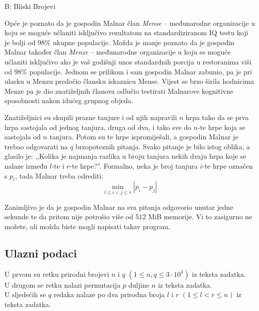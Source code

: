 \begin{statement}[
  timelimit=1 s,
  memorylimit=512 MiB,
]{B: Bliski Brojevi}

Opće je poznato da je gospodin Malnar član \textit{Mense} -- međunarodne
organizacije u koju se moguće učlaniti isključivo rezultatom na standardiziranom
IQ testu koji je bolji od $98\%$ ukupne populacije. Možda je manje poznato da je
gospodin Malnar također član \textit{Menze} -- međunarodne organizacije u koju
se moguće učlaniti isključivo ako je vaš godišnji unos standardnih porcija u
restoranima viši od $98\%$ populacije. Jednom se prilikom i sam gospodin Malnar
zabunio, pa je pri ulasku u Menzu predočio člansku iskaznicu Mense. Vijest se
brzo širila hodnicima Menze pa je dio znatiželjnih članova odlučio testirati
Malnarove kognitivne sposobnosti nakon idućeg grupnog objeda.

Znatiželjnici su skupili prazne tanjure i od njih napravili $n$ hrpa tako
da se prva hrpa sastojala od jednog tanjura, druga od dva, i tako sve do
$n$-te hrpe koja se sastojala od $n$ tanjura. Potom su te hrpe ispromiješali, a
gospodin Malnar je trebao odgovarati na $q$ brzopoteznih pitanja. Svako pitanje
je bilo istog oblika, a glasilo je: ,,Kolika je najmanja razlika u broju tanjura
nekih dvaju hrpa koje se nalaze između $l$-te i $r$-te hrpe?''. Formalno, neka
je broj tanjura $i$-te hrpe označen s $p_i$, tada Malnar treba odrediti:
$$\min_{l \le i < j \le r}{|p_i - p_j|}$$

Zanimljivo je da je gospodin Malnar na sva pitanja odgovorio unutar jedne
sekunde te da pritom nije potrošio više od $512$ MiB memorije. Vi to
zasigurno ne možete, ali možda biste mogli napisati takav program.

\subsection*{Ulazni podaci}
U prvom su retku prirodni brojevi $n$ i $q$ $(1 \le n, q \le 3 \cdot 10^4)$ iz
teksta zadatka.\\
U drugom se retku nalazi permutacija $p$ duljine $n$ iz teksta zadatka.\\
U sljedećih se $q$ redaka nalaze po dva prirodna broja $l$ i $r$
$(1 \le l < r \le n)$ iz teksta zadatka.


\end{statement}
